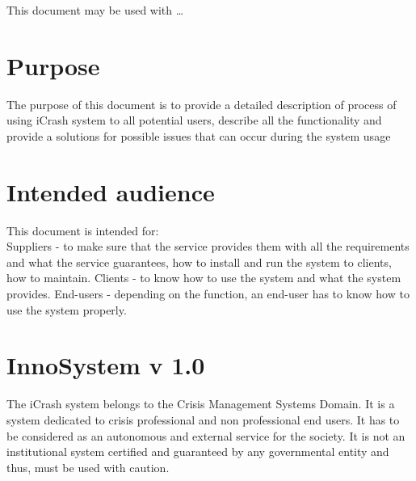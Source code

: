  
This document may be used with \ldots




\section{Purpose}
The purpose of this document is to provide a detailed description of process of using iCrash system to all potential users, describe all the functionality and provide a solutions for possible issues that can occur during the system usage 


\section{Intended audience}

This document is intended for:\\
Suppliers - to make sure that the service provides them with all the
requirements and what the service guarantees, how to install and run the system to clients,
how to maintain. 
Clients  - to know how to use the system and what the system provides. 
End-users - depending on the function, an end-user has to know how to use the
system properly.


\section{InnoSystem v 1.0}
The iCrash system belongs to the Crisis Management Systems Domain. It is a
system dedicated to crisis professional and non professional end users. It has
to be considered as an autonomous and external service for the society. It is not an institutional system certified and guaranteed by any governmental entity and thus, must be used with caution.\\


